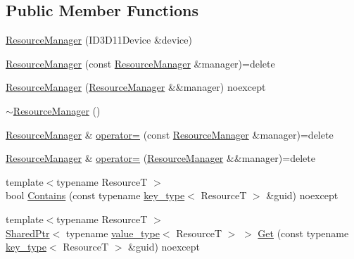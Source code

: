 \subsection*{Public Member Functions}
\begin{DoxyCompactItemize}
\item 
\hyperlink{classmage_1_1rendering_1_1_resource_manager_a2274df2c0badb1dd2e79642e69c76cb7}{Resource\+Manager} (I\+D3\+D11\+Device \&device)
\item 
\hyperlink{classmage_1_1rendering_1_1_resource_manager_a94b757238211a5b6fe44d773b579ca0a}{Resource\+Manager} (const \hyperlink{classmage_1_1rendering_1_1_resource_manager}{Resource\+Manager} \&manager)=delete
\item 
\hyperlink{classmage_1_1rendering_1_1_resource_manager_a3d54199cf484d11c1d1039eeb306016c}{Resource\+Manager} (\hyperlink{classmage_1_1rendering_1_1_resource_manager}{Resource\+Manager} \&\&manager) noexcept
\item 
\hyperlink{classmage_1_1rendering_1_1_resource_manager_a7289ca2a270e6de613eff041ba04d4a4}{$\sim$\+Resource\+Manager} ()
\item 
\hyperlink{classmage_1_1rendering_1_1_resource_manager}{Resource\+Manager} \& \hyperlink{classmage_1_1rendering_1_1_resource_manager_a188467ab4e46176ee5184c9f5e5ac64f}{operator=} (const \hyperlink{classmage_1_1rendering_1_1_resource_manager}{Resource\+Manager} \&manager)=delete
\item 
\hyperlink{classmage_1_1rendering_1_1_resource_manager}{Resource\+Manager} \& \hyperlink{classmage_1_1rendering_1_1_resource_manager_a1e3f511409bcde3a7a3296364a0298f5}{operator=} (\hyperlink{classmage_1_1rendering_1_1_resource_manager}{Resource\+Manager} \&\&manager)=delete
\item 
{\footnotesize template$<$typename ResourceT $>$ }\\bool \hyperlink{classmage_1_1rendering_1_1_resource_manager_a7df24baa95d7a43697cba243dd5b5a54}{Contains} (const typename \hyperlink{classmage_1_1rendering_1_1_resource_manager_a097b505b275b411e02c73d1899e91a44}{key\+\_\+type}$<$ ResourceT $>$ \&guid) noexcept
\item 
{\footnotesize template$<$typename ResourceT $>$ }\\\hyperlink{namespacemage_a1e01ae66713838a7a67d30e44c67703e}{Shared\+Ptr}$<$ typename \hyperlink{classmage_1_1rendering_1_1_resource_manager_abb6ad8fd8054364a230839110c42174f}{value\+\_\+type}$<$ ResourceT $>$ $>$ \hyperlink{classmage_1_1rendering_1_1_resource_manager_aeb229ae49bde59cb6c146f9749851363}{Get} (const typename \hyperlink{classmage_1_1rendering_1_1_resource_manager_a097b505b275b411e02c73d1899e91a44}{key\+\_\+type}$<$ ResourceT $>$ \&guid) noexcept

\end{DoxyCompactItemize}
